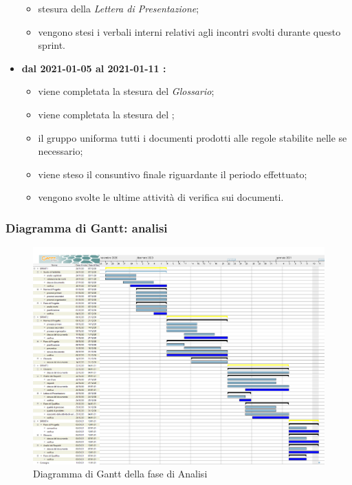 \begin{itemize}
\begin{itemize}
		\item stesura della \textit{Lettera di Presentazione};
		\item vengono stesi i verbali interni relativi agli incontri svolti durante questo sprint.
	\end{itemize}
	\item \textbf{dal 2021-01-05 al 2021-01-11 :}
	\begin{itemize}
		\item viene completata la stesura del \textit{Glossario};
		\item viene completata la stesura del \AdR{};
		\item il gruppo uniforma tutti i documenti prodotti alle regole stabilite nelle \NdP{} se necessario;
		\item viene steso il consuntivo finale riguardante il periodo effettuato;
		\item vengono svolte le ultime attività di verifica sui documenti.
	\end{itemize}
\end{itemize}

\subsubsection{Diagramma di Gantt: analisi}
\begin{figure}[H]
    \centering
    \includegraphics[scale = 0.25]{components/img/Analisi.png}
    \caption{Diagramma di Gantt della fase di Analisi}
    \label{fig:Diagramma di Gantt, fase di Analisi}
\end{figure}

